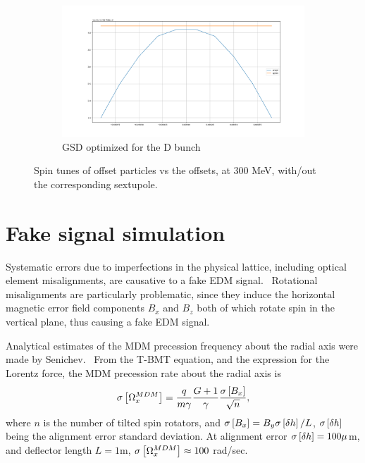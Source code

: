 \documentclass{article}
\begin{document}
\begin{figure}\ContinuedFloat
  \begin{subfigure}[b]{\textwidth}\centering
    \includegraphics[width=\textwidth]{img/SPINTUNE_D_GSD_optim}
    \caption{GSD optimized for the D bunch}
  \end{subfigure}
  \caption{Spin tunes of offset particles vs the offsets, at 300 MeV, with/out the corresponding sextupole.\label{fig:OptSext}}
\end{figure}


\section{Fake signal simulation}

Systematic errors due to imperfections in the physical lattice, including optical element misalignments, are causative to a fake EDM signal.~\citep[p.~230]{Eremey:Thesis} Rotational misalignments are particularly problematic, since they induce the horizontal magnetic error field components $B_x$ and $B_z$ both of which rotate spin in the vertical plane, thus causing a fake EDM signal.

Analytical estimates of the MDM precession frequency about the radial axis were made by Senichev.~\cite{Senichev:FDM} From the T-BMT equation, and the expression for the Lorentz force, the MDM precession rate about the radial axis is
\begin{equation}
  \SD{\W_x^{MDM}} = \frac{q}{m\gamma}\frac{G+1}{\gamma}\frac{\SD{B_x}}{\sqrt{n}},
\end{equation}
where $n$ is the number of tilted spin rotators, and $\SD{B_x} = B_y \SD{\delta h}/L$, $\SD{\delta h}$  being the alignment error standard deviation. At alignment error $\SD{\delta h} = 100 \mu$m, and deflector length $L=1$m, $\SD{\W_x^{MDM}} \approx 100$ rad/sec.~\cite{Senichev:FDM}
\end{document}

